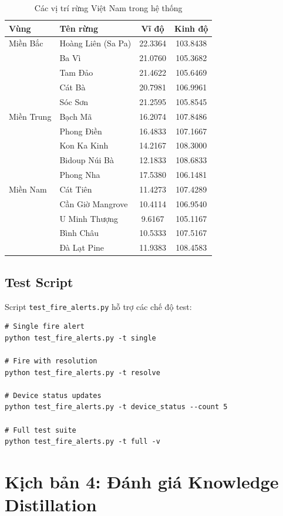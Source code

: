 \documentclass[12pt,a4paper]{report}
\begin{document}
\begin{table}[h]
  \centering
  \caption{Các vị trí rừng Việt Nam trong hệ thống}
  \begin{tabular}{llcc}
    \toprule
    Vùng & Tên rừng & Vĩ độ & Kinh độ \\
    \midrule
    Miền Bắc & Hoàng Liên (Sa Pa) & 22.3364 & 103.8438 \\
    & Ba Vì & 21.0760 & 105.3682 \\
    & Tam Đảo & 21.4622 & 105.6469 \\
    & Cát Bà & 20.7981 & 106.9961 \\
    & Sóc Sơn & 21.2595 & 105.8545 \\
    \midrule
    Miền Trung & Bạch Mã & 16.2074 & 107.8486 \\
    & Phong Điền & 16.4833 & 107.1667 \\
    & Kon Ka Kinh & 14.2167 & 108.3000 \\
    & Bidoup Núi Bà & 12.1833 & 108.6833 \\
    & Phong Nha & 17.5380 & 106.1481 \\
    \midrule
    Miền Nam & Cát Tiên & 11.4273 & 107.4289 \\
    & Cần Giờ Mangrove & 10.4114 & 106.9540 \\
    & U Minh Thượng & 9.6167 & 105.1167 \\
    & Bình Châu & 10.5333 & 107.5167 \\
    & Đà Lạt Pine & 11.9383 & 108.4583 \\
    \bottomrule
  \end{tabular}
\end{table}

\subsection{Test Script}

Script \texttt{test\_fire\_alerts.py} hỗ trợ các chế độ test:
\begin{verbatim}
# Single fire alert
python test_fire_alerts.py -t single

# Fire with resolution
python test_fire_alerts.py -t resolve

# Device status updates
python test_fire_alerts.py -t device_status --count 5

# Full test suite
python test_fire_alerts.py -t full -v
\end{verbatim}

\section{Kịch bản 4: Đánh giá Knowledge Distillation}
\end{document}
